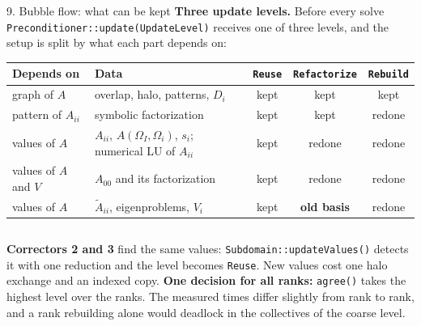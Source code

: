 \documentclass[aspectratio=169,10pt]{beamer}
\newcommand{\At}{\widetilde{A}}
\newcommand{\code}[1]{\texttt{#1}}
\newcommand\Wextra{{-81}{-19}{17}{9}}
\newcommand\mapbadge[1]{%
  \begin{tikzpicture}[remember picture,overlay]
    \node[anchor=north east,fill=white,rounded corners=1.2pt,inner sep=0.9pt]
      at ($(current page.north east)+(-1.8mm,-0.75mm)$) {\expandafter\cmthumb#1{17mm}};
  \end{tikzpicture}}
\begin{document}
\begin{frame}{9. Bubble flow: what can be kept}
  \small
  \textbf{\color{schwarz}Three update levels.} Before every solve \code{Preconditioner::update(UpdateLevel)}
  receives one of three levels, and the setup is split by \alert{what each part depends on}:
  \begin{center}
  \footnotesize
  \begin{tabular}{@{}llccc@{}}
    \toprule
    Depends on & Data & \code{Reuse} & \code{Refactorize} & \code{Rebuild}\\
    \midrule
    graph of $A$ & overlap, halo, patterns, $D_i$ & kept & kept & kept\\
    pattern of $A_{ii}$ & symbolic factorization & kept & kept & redone\\
    values of $A$ & $A_{ii}$, $A(\Omega_I,\Omega_i)$, $s_i$; numerical LU of $A_{ii}$ & kept & redone & redone\\
    values of $A$ and $V$ & $A_{00}$ and its factorization & kept & redone & redone\\
    values of $A$ & $\At_{ii}$, eigenproblems, $V_i$ & kept & \textbf{old basis} & redone\\
    \bottomrule
  \end{tabular}
  \end{center}

  \vspace{2mm}
  \begin{columns}[T,onlytextwidth]
    \footnotesize
    \textbf{\color{schwarz}Correctors 2 and 3} find the same values: \code{Subdomain::updateValues()}
    detects it with one reduction and the level becomes \code{Reuse}. New values cost one halo exchange
    and an indexed copy.
    \footnotesize
    \textbf{\color{schwarz}One decision for all ranks:} \code{agree()} takes the highest level over the
    ranks. The measured times differ slightly from rank to rank, and a rank rebuilding alone would
    deadlock in the collectives of the coarse level.
  \end{columns}
\end{frame}
\end{document}
